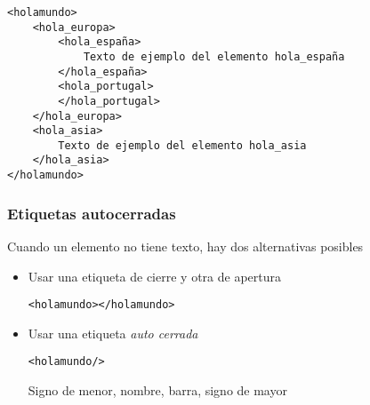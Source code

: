 \documentclass[ucs]{beamer}
\begin{document}
\begin{frame}[fragile]
\frametitle{}
  \begin{footnotesize}
  \begin{verbatim}
<holamundo>
    <hola_europa>
        <hola_españa>
            Texto de ejemplo del elemento hola_españa
        </hola_españa>
        <hola_portugal>
        </hola_portugal>
    </hola_europa>
    <hola_asia>
        Texto de ejemplo del elemento hola_asia
    </hola_asia>
</holamundo>
  \end{verbatim}
  \end{footnotesize}

\end{frame}


\begin{frame}[fragile]
\frametitle{Etiquetas autocerradas}
Cuando un elemento no tiene texto, hay dos alternativas posibles
\begin{itemize}
\item
Usar una etiqueta de cierre y otra de apertura

  \begin{footnotesize}
  \begin{verbatim}
<holamundo></holamundo>
  \end{verbatim}
  \end{footnotesize}
\item
Usar una etiqueta \emph{auto cerrada}
  \begin{footnotesize}
  \begin{verbatim}
<holamundo/>
  \end{verbatim}
  \end{footnotesize}
Signo de menor, nombre, barra, signo de mayor
\end{itemize}

\end{frame}
\end{document}

